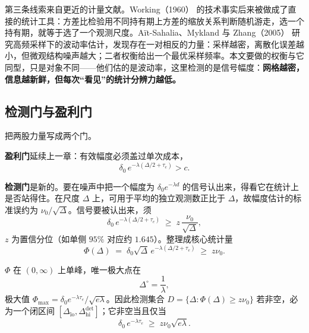 第三条线索来自更近的计量文献。Working（1960）\cite{working1960} 的技术事实后来被做成了直接的统计工具：方差比检验用不同持有期上方差的缩放关系判断随机游走，选一个持有期，就等于选了一个观测尺度\cite{lo1988}。Aït-Sahalia、Mykland 与 Zhang（2005）\cite{atisahalia2005} 研究高频采样下的波动率估计，发现存在一对相反的力量：采样越密，离散化误差越小，但微观结构噪声越大；二者权衡给出一个最优采样频率。本文要做的权衡与它同型，只是对象不同——他们估的是波动率，这里检测的是信号幅度：\textbf{网格越密，信息越新鲜，但每次“看见”的统计分辨力越低。}

\subsection{检测门与盈利门}\label{sec:twogates}

把两股力量写成两个门。

\textbf{盈利门}延续上一章：有效幅度必须盖过单次成本，
\begin{equation}
  \delta_0\,e^{-\lambda(\Delta/2+\tau_e)} > c .
  \label{eq:profitgate}
\end{equation}

\textbf{检测门}是新的。要在噪声中把一个幅度为 $\delta_0 e^{-\lambda d}$ 的信号认出来，得看它在统计上是否站得住。在尺度 $\Delta$ 上，可用于平均的独立观测数正比于 $\Delta$，故幅度估计的标准误约为 $\nu_0/\sqrt{\Delta}$。信号要被认出来，须
\begin{equation}
  \delta_0\,e^{-\lambda(\Delta/2+\tau_e)} \;\ge\; z\,\frac{\nu_0}{\sqrt{\Delta}},
  \label{eq:detectgate}
\end{equation}
$z$ 为置信分位（如单侧 $95\%$ 对应约 $1.645$）。整理成核心统计量
\begin{equation}
  \Phi(\Delta) \;=\; \delta_0\sqrt{\Delta}\,e^{-\lambda(\Delta/2+\tau_e)} \;\ge\; z\nu_0 .
  \label{eq:Phi}
\end{equation}

\begin{proposition}[检测集合的形状]\label{prop:detect}
$\Phi$ 在 $(0,\infty)$ 上单峰，唯一极大点在
\begin{equation}
  \Delta^\circ = \frac{1}{\lambda},
\end{equation}
极大值 $\Phi_{\max}=\delta_0 e^{-\lambda\tau_e}/\sqrt{e\lambda}$。因此检测集合 $D=\{\Delta:\Phi(\Delta)\ge z\nu_0\}$ 若非空，必为一个闭区间 $[\Delta_{\mathrm{lo}},\Delta_{\mathrm{hi}}^{\mathrm{det}}]$；它非空当且仅当
\begin{equation}
  \delta_0\,e^{-\lambda\tau_e} \;\ge\; z\nu_0\sqrt{e\lambda}.
  \label{eq:detectfeasible}
\end{equation}
\end{proposition}

